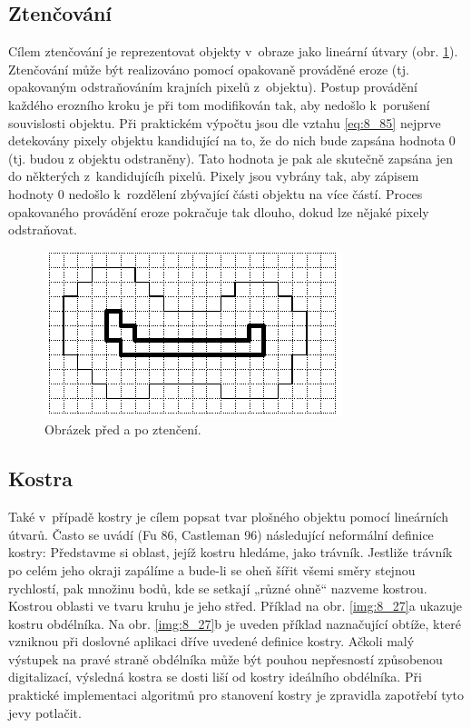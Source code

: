 \subsection*{Ztenčování}

Cílem ztenčování je reprezentovat objekty v~obraze jako lineární útvary (obr. \ref{img:8_26}). Ztenčování může být realizováno pomocí opakovaně prováděné eroze (tj. opakovaným odstraňováním krajních pixelů z~objektu). Postup provádění každého erozního kroku je při tom modifikován tak, aby nedošlo k~porušení souvislosti objektu. Při praktickém výpočtu jsou dle vztahu \eqref{eq:8_85} nejprve detekovány pixely objektu kandidující na to, že do nich bude zapsána hodnota 0 (tj. budou z objektu odstraněny). Tato hodnota je pak ale skutečně zapsána jen do některých z~kandidujícíh pixelů. Pixely jsou vybrány tak, aby zápisem hodnoty 0 nedošlo k~rozdělení zbývající části objektu na více částí. Proces opakovaného provádění eroze pokračuje tak dlouho, dokud lze nějaké pixely odstraňovat.

\begin{figure}[th]
    \begin{center}
        \includegraphics[scale=0.9]{08_segmentace/images/img_8_26.pdf}
    \end{center}
    \caption{Obrázek před a po ztenčení.}
    \label{img:8_26}
\end{figure}

\subsection*{Kostra}

Také v~případě kostry je cílem popsat tvar plošného objektu pomocí lineárních útvarů. Často se uvádí (Fu 86, Castleman 96) následující neformální definice kostry: Představme si oblast, jejíž kostru hledáme, jako trávník. Jestliže trávník po celém jeho okraji zapálíme a bude-li se oheň šířit všemi směry stejnou rychlostí, pak množinu bodů, kde se setkají „různé ohně`` nazveme kostrou. Kostrou oblasti ve tvaru kruhu je jeho střed. Příklad na obr. \ref{img:8_27}a ukazuje kostru obdélníka. Na obr. \ref{img:8_27}b je uveden příklad naznačující obtíže, které vzniknou při doslovné aplikaci dříve uvedené definice kostry. Ačkoli malý výstupek na pravé straně obdélníka může být pouhou nepřesností způsobenou digitalizací, výsledná kostra se dosti liší od kostry ideálního obdélníka. Při praktické implementaci algoritmů pro stanovení kostry je zpravidla zapotřebí  tyto jevy potlačit.

